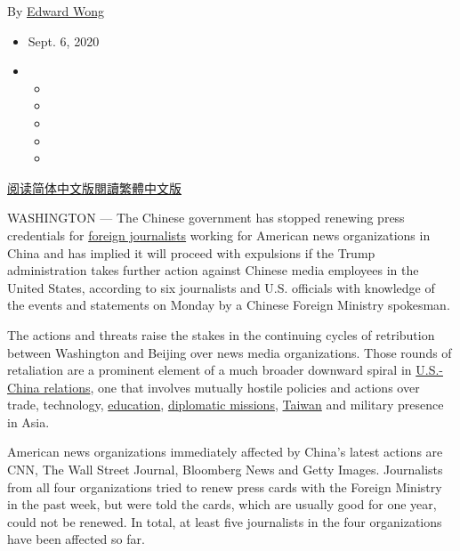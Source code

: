 By \href{https://www.nytimes3xbfgragh.onion/by/edward-wong}{Edward Wong}

\begin{itemize}
\item
  Sept. 6, 2020
\item
  \begin{itemize}
  \item
  \item
  \item
  \item
  \item
  \end{itemize}
\end{itemize}

\href{https://cn.nytimes3xbfgragh.onion/china/20200907/china-us-journalists-visas-expulsions/}{阅读简体中文版}\href{https://cn.nytimes3xbfgragh.onion/china/20200907/china-us-journalists-visas-expulsions/zh-hant/}{閱讀繁體中文版}

WASHINGTON --- The Chinese government has stopped renewing press
credentials for
\href{https://www.nytimes3xbfgragh.onion/2018/01/05/sunday-review/china-military-economic-power.html}{foreign
journalists} working for American news organizations in China and has
implied it will proceed with expulsions if the Trump administration
takes further action against Chinese media employees in the United
States, according to six journalists and U.S. officials with knowledge
of the events and statements on Monday by a Chinese Foreign Ministry
spokesman.

The actions and threats raise the stakes in the continuing cycles of
retribution between Washington and Beijing over news media
organizations. Those rounds of retaliation are a prominent element of a
much broader downward spiral in
\href{https://www.nytimes3xbfgragh.onion/2019/06/26/world/asia/united-states-china-conflict.html}{U.S.-China
relations}, one that involves mutually hostile policies and actions over
trade, technology,
\href{https://www.nytimes3xbfgragh.onion/2020/05/28/us/politics/china-hong-kong-trump-student-visas.html}{education},
\href{https://www.nytimes3xbfgragh.onion/2020/07/22/world/asia/us-china-houston-consulate.html}{diplomatic
missions},
\href{https://www.nytimes3xbfgragh.onion/2020/08/17/us/politics/trump-china-taiwan-hong-kong.html}{Taiwan}
and military presence in Asia.

American news organizations immediately affected by China's latest
actions are CNN, The Wall Street Journal, Bloomberg News and Getty
Images. Journalists from all four organizations tried to renew press
cards with the Foreign Ministry in the past week, but were told the
cards, which are usually good for one year, could not be renewed. In
total, at least five journalists in the four organizations have been
affected so far.


